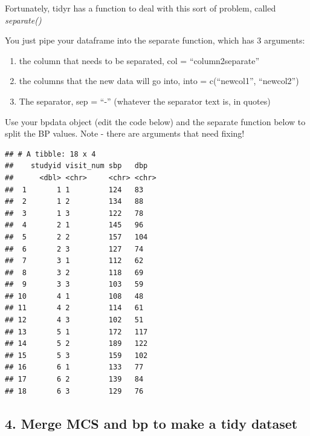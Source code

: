 \documentclass[
]{book}
\newenvironment{Shaded}{\begin{snugshade}}{\end{snugshade}}
\newcommand{\DataTypeTok}[1]{\textcolor[rgb]{0.13,0.29,0.53}{#1}}
\newcommand{\KeywordTok}[1]{\textcolor[rgb]{0.13,0.29,0.53}{\textbf{#1}}}
\newcommand{\NormalTok}[1]{#1}
\newcommand{\OperatorTok}[1]{\textcolor[rgb]{0.81,0.36,0.00}{\textbf{#1}}}
\newcommand{\StringTok}[1]{\textcolor[rgb]{0.31,0.60,0.02}{#1}}
\providecommand{\tightlist}{%
  \setlength{\itemsep}{0pt}\setlength{\parskip}{0pt}}
\begin{document}
Fortunately, tidyr has a function to deal with this sort of problem, called \emph{separate()}

You just pipe your dataframe into the separate function, which has 3 arguments:

\begin{enumerate}
\def\labelenumi{\arabic{enumi}.}
\tightlist
\item
  the column that needs to be separated, col = ``column2separate''
\item
  the columns that the new data will go into, into = c(``newcol1'', ``newcol2'')
\item
  The separator, sep = ``-'' (whatever the separator text is, in quotes) 
\end{enumerate}

Use your bpdata object (edit the code below) and the separate function below to split the BP values. Note - there are arguments that need fixing!

\begin{Shaded}
\end{Shaded}

\begin{verbatim}
## # A tibble: 18 x 4
##    studyid visit_num sbp   dbp  
##      <dbl> <chr>     <chr> <chr>
##  1       1 1         124   83   
##  2       1 2         134   88   
##  3       1 3         122   78   
##  4       2 1         145   96   
##  5       2 2         157   104  
##  6       2 3         127   74   
##  7       3 1         112   62   
##  8       3 2         118   69   
##  9       3 3         103   59   
## 10       4 1         108   48   
## 11       4 2         114   61   
## 12       4 3         102   51   
## 13       5 1         172   117  
## 14       5 2         189   122  
## 15       5 3         159   102  
## 16       6 1         133   77   
## 17       6 2         139   84   
## 18       6 3         129   76
\end{verbatim}

\hypertarget{merge-mcs-and-bp-to-make-a-tidy-dataset}{%
\subsection{4. Merge MCS and bp to make a tidy dataset}\label{merge-mcs-and-bp-to-make-a-tidy-dataset}}
\end{document}
